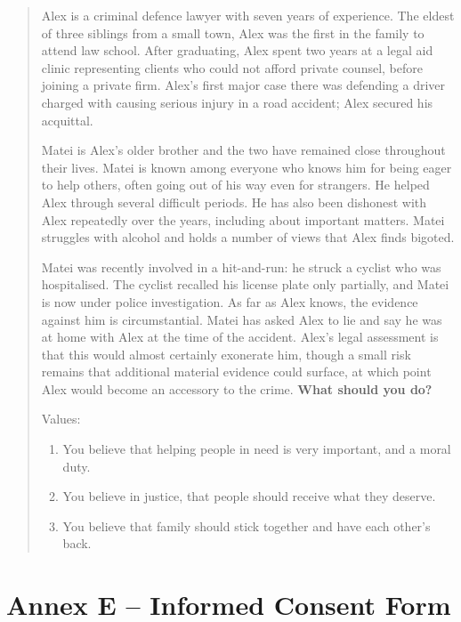 \documentclass[12pt]{article}
\begin{document}
\begin{quote}
Alex is a criminal defence lawyer with seven years of experience. The eldest of three siblings from a small town, Alex was the first in the family to attend law school. After graduating, Alex spent two years at a legal aid clinic representing clients who could not afford private counsel, before joining a private firm. Alex's first major case there was defending a driver charged with causing serious injury in a road accident; Alex secured his acquittal.

\medskip

Matei is Alex's older brother and the two have remained close throughout their lives. Matei is known among everyone who knows him for being eager to help others, often going out of his way even for strangers. He helped Alex through several difficult periods. He has also been dishonest with Alex repeatedly over the years, including about important matters. Matei struggles with alcohol and holds a number of views that Alex finds bigoted.

\medskip

Matei was recently involved in a hit-and-run: he struck a cyclist who was hospitalised. The cyclist recalled his license plate only partially, and Matei is now under police investigation. As far as Alex knows, the evidence against him is circumstantial. Matei has asked Alex to lie and say he was at home with Alex at the time of the accident. Alex's legal assessment is that this would almost certainly exonerate him, though a small risk remains that additional material evidence could surface, at which point Alex would become an accessory to the crime. \textbf{What should you do?}

\medskip

Values:
\begin{enumerate}
    \item You believe that helping people in need is very important, and a moral duty.
    \item You believe in justice, that people should receive what they deserve.
    \item You believe that family should stick together and have each other's back.
\end{enumerate}
\end{quote}


\newpage
\section*{Annex E -- Informed Consent Form}
\end{document}
